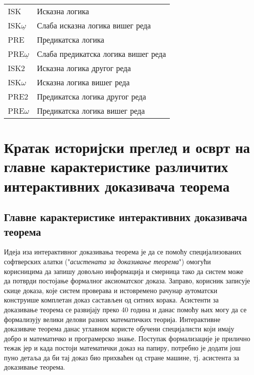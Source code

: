 \begin{tabular}{|ll|}
\hline
ISK & Исказна логика \\
ISK$\underline{\omega}$ & Слаба исказна логика вишег реда \\
PRE & Предикатска логика \\
PRE$\underline{\omega}$ & Слаба предикатска логика вишег реда \\
ISK2 & Исказна логика другог реда\\
ISK$\omega$ & Исказна логика вишег реда\\
PRE2 & Предикатска логика другог реда\\
PRE$\omega$ & Предикатска логика вишег реда\\
\hline
\end{tabular}



\section{Кратак историјски преглед и осврт на главне карактеристике различитих интерактивних доказивача теорема}

\subsection{Главне карактеристике интерактивних доказивача теорема}

Идеја иза интерактивног доказивања теорема је да се помоћу
специјализованих софтверских алатки ("\emph{асистената за доказивање
  теорема}") омогући корисницима да запишу довољно информација и
смерница тако да систем може да потврди постојање формалног
аксиоматског доказа. Заправо, корисник записује скице доказа, које
систем проверава и истовремено рачунар аутоматски конструише комплетан
доказ састављен од ситних корака. Асистенти за доказивање теорема се
развијају преко 40 година и данас помоћу њих могу да се формализују
велики делови разних математичких теорија. Интерактивне доказиваче
теорема данас углавном користе обучени специјалисти који имају добро и
математичко и програмерско знање. Поступак формализације је прилично
тежак јер и када постоји математички доказ на папиру, потребно је
додати још пуно детаља да би тај доказ био прихваћен од стране машине,
тј. асистента за доказивање теорема.

